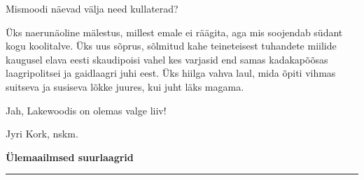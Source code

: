 \documentclass[10pt]{book}
\begin{document}
Mismoodi n\"aevad v\"alja need kullaterad?

\"Uks naerun\"aoline m\"alestus, millest emale ei r\"a\"agita, aga mis soojendab s\"udant kogu koolitalve.  \"Uks uus s\~oprus, s\~olmitud kahe teineteisest tuhandete miilide kaugusel elava eesti skaudipoisi vahel kes varjasid end samas kadakap\~o\~osas laagripolitsei ja gaidlaagri juhi eest.  \"Uks hiilga vahva laul, mida \~opiti vihmas suitseva ja susiseva l\~okke juures, kui juht l\"aks magama.

Jah, Lakewoodis on olemas valge liiv!

\hfill
Jyri Kork, nskm.

\cleardoublepage
{\samepage\raggedbottom
\raggedright
\sloppy
\centerline{ {\bf {\large \"Ulemaailmsed suurlaagrid}}}
\vspace{0.1in}
\hrule height 0.05ex}
\end{document}
